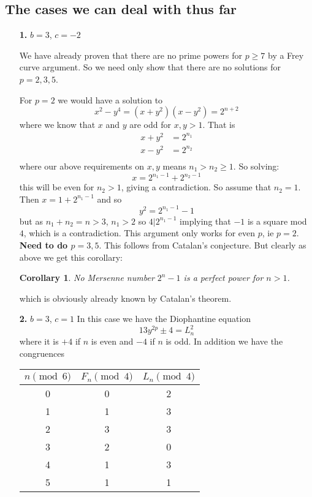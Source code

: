 \documentclass[12pt]{article}
\newtheorem{cor}[thm]{Corollary}
\begin{document}
\subsection{The cases we can deal with thus far}

\begin{enumerate}

\item[\textbf{1.}] $b = 3$, $c = -2$

We have already proven that there are no prime powers for $p \geq 7$ by a Frey curve argument.  So we need only show that there are no solutions for $p = 2,3,5$.

For $p=2$ we would have a solution to
\[ x^2-y^{4} = (x+y^2)(x-y^2)= 2^{n+2} \]
where we know that $x$ and $y$ are odd for $x,y >1$.  That is
\begin{align*}
x+y^2 & = 2^{n_1} \\
x-y^2 & = 2^{n_2} \\ 
\end{align*}
where our above requirements on $x,y$ means $n_1 > n_2  \geq 1$.  So solving:
\[ x = 2^{n_1-1} +2^{n_2-1} \]
this will be even for $n_2 >1$, giving a contradiction.  So assume that $n_2 = 1$.  Then $x = 1+2^{n_1-1}$ and so 
\[ y^2 = 2^{n_1-1} - 1 \]
but as $n_1+n_2 = n >3$, $n_1 > 2$ so $4|2^{n_1-1}$ implying that $-1$ is a square mod $4$, which is a contradiction.   This argument only works for even $p$, ie $p = 2$.  \textbf{Need to do $p=3,5$}.  This follows from Catalan's conjecture.  But clearly as above we get this corollary:

\begin{cor}
No Mersenne number $2^n-1$ is a perfect power for $n>1$.
\end{cor}

which is obviously already known by Catalan's theorem.
 
\item[\textbf{2.}] $b = 3$, $c = 1$
In this case we have the Diophantine equation
\[13y^{2p}  \pm 4 = L_n^2\]
where it is $+4$ if $n$ is even and $-4$ if $n$ is odd.  
In addition we have the congruences
\begin{center}
\begin{tabular}{c| c c}
$n \pmod{6}$ & $F_n \pmod{4}$ & $L_n \pmod{4}$ \\ \hline \hline
0 & 0 & 2 \\
1 & 1 &  3 \\
2 & 3 & 3 \\
3 & 2 & 0 \\
4 & 1 & 3 \\
5 & 1 & 1  \\ \hline \hline
\end{tabular}
\end{center}


\end{enumerate}
\end{document}

